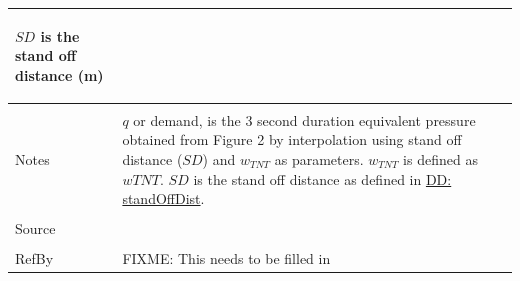 \documentclass[12pt]{article}
\begin{document}
\begin{minipage}{\textwidth}
\begin{tabular}{p{} p{}}
\begin{symbDescription}
              \item{$SD$ is the stand off distance (m)}
              \end{symbDescription}
\\ \midrule \\
Notes & $q$ or demand, is the 3 second duration equivalent pressure obtained from Figure 2 by interpolation using stand off distance ($SD$) and ${w_{TNT}}$ as parameters. ${w_{TNT}}$ is defined as $w TNT$. $SD$ is the stand off distance as defined in \hyperref[DD:standOffDist]{DD: standOffDist}.
\\ \midrule \\
Source & \cite{astm2009}
\\ \midrule \\
RefBy & FIXME: This needs to be filled in
\\ \bottomrule \end{tabular}
\end{minipage}\\
\end{document}
